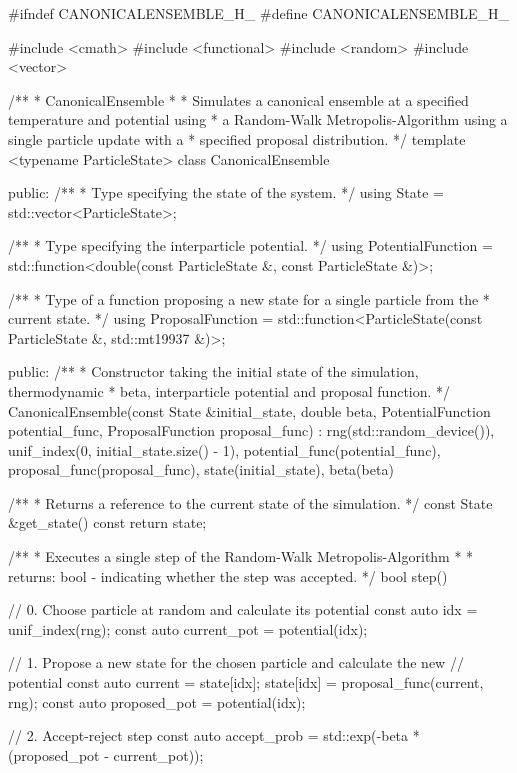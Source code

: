 #ifndef CANONICALENSEMBLE_H_
#define CANONICALENSEMBLE_H_

#include <cmath>
#include <functional>
#include <random>
#include <vector>

/**
 * CanonicalEnsemble
 *
 * Simulates a canonical ensemble at a specified temperature and potential using
 * a Random-Walk Metropolis-Algorithm using a single particle update with a
 * specified proposal distribution.
 */
template <typename ParticleState>
class CanonicalEnsemble {
public:
    /**
     * Type specifying the state of the system.
     */
    using State = std::vector<ParticleState>;

    /**
     * Type specifying the interparticle potential.
     */
    using PotentialFunction =
        std::function<double(const ParticleState &, const ParticleState &)>;

    /**
     * Type of a function proposing a new state for a single particle from the
     * current state.
     */
    using ProposalFunction =
        std::function<ParticleState(const ParticleState &, std::mt19937 &)>;

public:
    /**
     * Constructor taking the initial state of the simulation, thermodynamic
     * beta, interparticle potential and proposal function.
     */
    CanonicalEnsemble(const State &initial_state, double beta,
                      PotentialFunction potential_func,
                      ProposalFunction proposal_func)
        : rng(std::random_device{}()), unif_index(0, initial_state.size() - 1),
          potential_func(potential_func), proposal_func(proposal_func),
          state(initial_state), beta(beta) {}

    /**
     * Returns a reference to the current state of the simulation.
     */
    const State &get_state() const { return state; }

    /**
     * Executes a single step of the Random-Walk Metropolis-Algorithm
     *
     * returns: bool - indicating whether the step was accepted.
     */
    bool step() {
        // 0. Choose particle at random and calculate its potential
        const auto idx = unif_index(rng);
        const auto current_pot = potential(idx);

        // 1. Propose a new state for the chosen particle and calculate the new
        //    potential
        const auto current = state[idx];
        state[idx] = proposal_func(current, rng);
        const auto proposed_pot = potential(idx);

        // 2. Accept-reject step
        const auto accept_prob = std::exp(-beta * (proposed_pot - current_pot));

}}
